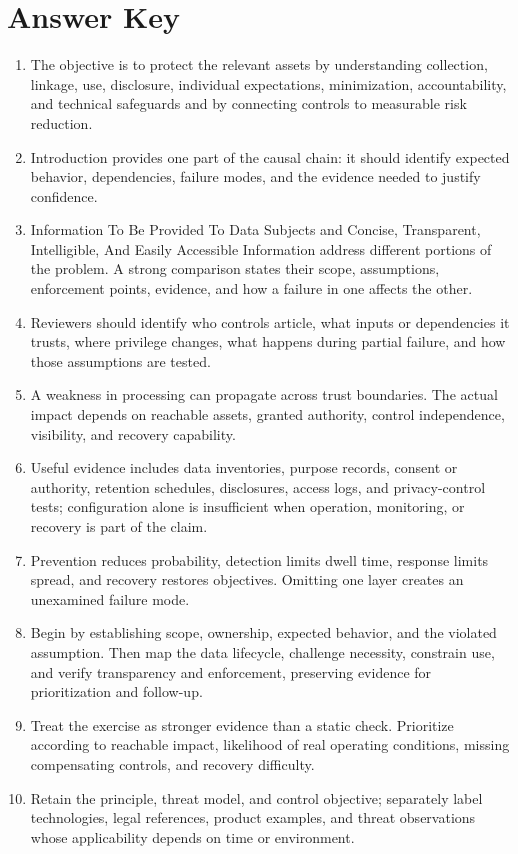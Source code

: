 \documentclass[11pt,letterpaper]{article}
\begin{document}
\section*{Answer Key}
\begin{enumerate}
\item The objective is to protect the relevant assets by understanding collection, linkage, use, disclosure, individual expectations, minimization, accountability, and technical safeguards and by connecting controls to measurable risk reduction.
\item Introduction provides one part of the causal chain: it should identify expected behavior, dependencies, failure modes, and the evidence needed to justify confidence.
\item Information To Be Provided To Data Subjects and Concise, Transparent, Intelligible, And Easily Accessible Information address different portions of the problem. A strong comparison states their scope, assumptions, enforcement points, evidence, and how a failure in one affects the other.
\item Reviewers should identify who controls article, what inputs or dependencies it trusts, where privilege changes, what happens during partial failure, and how those assumptions are tested.
\item A weakness in processing can propagate across trust boundaries. The actual impact depends on reachable assets, granted authority, control independence, visibility, and recovery capability.
\item Useful evidence includes data inventories, purpose records, consent or authority, retention schedules, disclosures, access logs, and privacy-control tests; configuration alone is insufficient when operation, monitoring, or recovery is part of the claim.
\item Prevention reduces probability, detection limits dwell time, response limits spread, and recovery restores objectives. Omitting one layer creates an unexamined failure mode.
\item Begin by establishing scope, ownership, expected behavior, and the violated assumption. Then map the data lifecycle, challenge necessity, constrain use, and verify transparency and enforcement, preserving evidence for prioritization and follow-up.
\item Treat the exercise as stronger evidence than a static check. Prioritize according to reachable impact, likelihood of real operating conditions, missing compensating controls, and recovery difficulty.
\item Retain the principle, threat model, and control objective; separately label technologies, legal references, product examples, and threat observations whose applicability depends on time or environment.
\end{enumerate}
\end{document}
